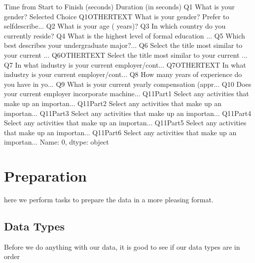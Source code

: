 \documentclass[letterpaper,10pt,english]{jupyterBook}
\begin{document}
\begin{sphinxVerbatim}[commandchars=\\\{\}]
Time from Start to Finish (seconds)                                Duration (in seconds)
Q1                                                What is your gender? \PYGZhy{} Selected Choice
Q1\PYGZus{}OTHER\PYGZus{}TEXT                          What is your gender? \PYGZhy{} Prefer to self\PYGZhy{}describe...
Q2                                                           What is your age (\PYGZsh{} years)?
Q3                                             In which country do you currently reside?
Q4                                     What is the highest level of formal education ...
Q5                                     Which best describes your undergraduate major?...
Q6                                     Select the title most similar to your current ...
Q6\PYGZus{}OTHER\PYGZus{}TEXT                          Select the title most similar to your current ...
Q7                                     In what industry is your current employer/cont...
Q7\PYGZus{}OTHER\PYGZus{}TEXT                          In what industry is your current employer/cont...
Q8                                     How many years of experience do you have in yo...
Q9                                     What is your current yearly compensation (appr...
Q10                                    Does your current employer incorporate machine...
Q11\PYGZus{}Part\PYGZus{}1                             Select any activities that make up an importan...
Q11\PYGZus{}Part\PYGZus{}2                             Select any activities that make up an importan...
Q11\PYGZus{}Part\PYGZus{}3                             Select any activities that make up an importan...
Q11\PYGZus{}Part\PYGZus{}4                             Select any activities that make up an importan...
Q11\PYGZus{}Part\PYGZus{}5                             Select any activities that make up an importan...
Q11\PYGZus{}Part\PYGZus{}6                             Select any activities that make up an importan...
Name: 0, dtype: object
\end{sphinxVerbatim}


\section{Preparation}
\label{\detokenize{c7_case_studies/UserSurvey:preparation}}
\sphinxAtStartPar
here we perform tasks to prepare the data in a more pleasing format.


\subsection{Data Types}
\label{\detokenize{c7_case_studies/UserSurvey:data-types}}
\sphinxAtStartPar
Before we do anything with our data, it is good to see if our data types are in order
\end{document}
